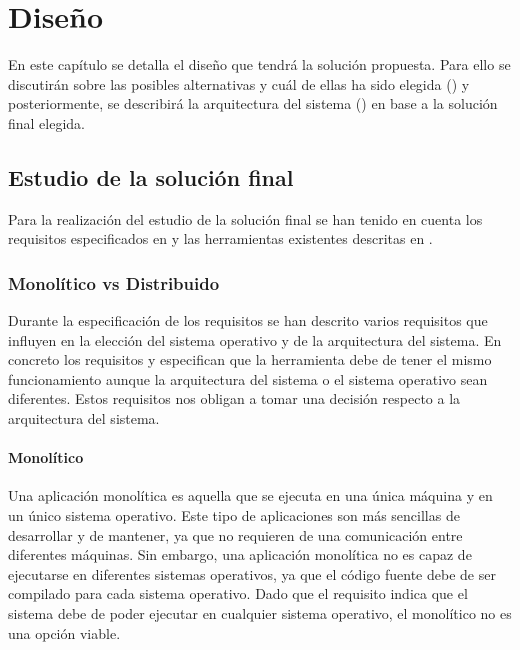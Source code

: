\chapter{Diseño}\label{chap:diseno}

En este capítulo se detalla el diseño que tendrá la solución propuesta. Para ello se discutirán sobre las posibles alternativas y cuál de ellas ha sido elegida () y posteriormente, se describirá la arquitectura del sistema () en base a la solución final elegida.

\section{Estudio de la solución final}\label{sec:estudio-solucion-final}

Para la realización del estudio de la solución final se han tenido en cuenta los requisitos especificados en  y las herramientas existentes descritas en . 

\subsection{Monolítico vs Distribuido} \label{subsec:monolitico-vs-distribuido}

Durante la especificación de los requisitos se han descrito varios requisitos que influyen en la elección del sistema operativo y de la arquitectura del sistema. En concreto los requisitos  y  especifican que la herramienta debe de tener el mismo funcionamiento aunque la arquitectura del sistema o el sistema operativo sean diferentes. Estos requisitos nos obligan a tomar una decisión respecto a la arquitectura del sistema. 

\subsubsection{Monolítico} \label{subsubsec:monolitico}

Una aplicación monolítica es aquella que se ejecuta en una única máquina y en un único sistema operativo. Este tipo de aplicaciones son más sencillas de desarrollar y de mantener, ya que no requieren de una comunicación entre diferentes máquinas. Sin embargo, una aplicación monolítica no es capaz de ejecutarse en diferentes sistemas operativos, ya que el código fuente debe de ser compilado para cada sistema operativo. Dado que el requisito  indica que el sistema debe de poder ejecutar en cualquier sistema operativo, el monolítico no es una opción viable.

